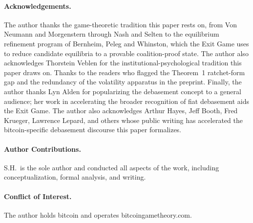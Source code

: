 \documentclass[12pt]{article}
\theoremstyle{definition}
\theoremstyle{remark}
\begin{document}
\paragraph*{Acknowledgements.}
The author thanks the game-theoretic tradition this paper rests on, from Von Neumann and Morgenstern through Nash and Selten to the equilibrium refinement program of Bernheim, Peleg and Whinston, which the Exit Game uses to reduce candidate equilibria to a provable coalition-proof state. The author also acknowledges Thorstein Veblen for the institutional-psychological tradition this paper draws on. Thanks to the readers who flagged the Theorem~1 ratchet-form gap and the redundancy of the volatility apparatus in the preprint. Finally, the author thanks Lyn Alden for popularizing the debasement concept to a general audience; her work in accelerating the broader recognition of fiat debasement aids the Exit Game. The author also acknowledges Arthur Hayes, Jeff Booth, Fred Krueger, Lawrence Lepard, and others whose public writing has accelerated the bitcoin-specific debasement discourse this paper formalizes.

\paragraph*{Author Contributions.}
S.H.\ is the sole author and conducted all aspects of the work,
including conceptualization, formal analysis, and writing.

\paragraph*{Conflict of Interest.}
The author holds bitcoin and operates bitcoingametheory.com.

\appendix
\end{document}

